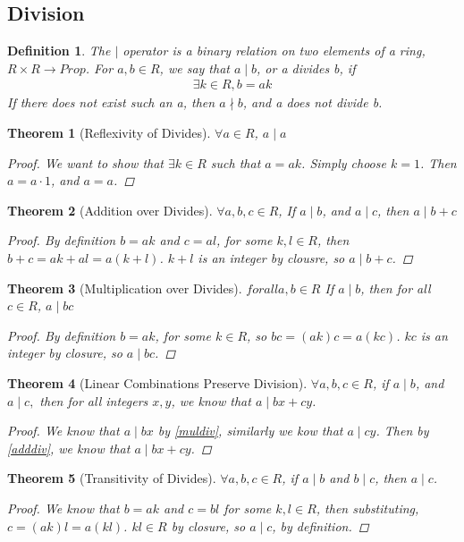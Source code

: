 \documentclass{article}
\newtheorem{thm}{Theorem}
\newtheorem*{defun}{Definition}
\begin{document}
  \subsection{Division}
  \begin{defun} The $\mid$ operator is a binary relation on two elements of a ring, $R \times R \to Prop$. For $a, b \in R$, we say that $a \mid b$, or a divides b, if
    \begin{align*}
      \exists k \in R, b = ak
    \end{align*}
    If there does not exist such an a, then $a \nmid b$, and a does not divide b.
  \end{defun}
  \begin{thm}[Reflexivity of Divides]\label{divrefl} $\forall a \in R$, $a \mid a$
    \begin{proof}
      We want to show that $\exists k \in R$ such that $a = ak$. Simply choose $k = 1$. Then $a = a\cdot1$, and $a = a$.
    \end{proof}
  \end{thm}
  \begin{thm}[Addition over Divides]\label{adddiv} $\forall a, b, c \in R$, If $a \mid b$, and $a \mid c$, then $a \mid b + c$
    \begin{proof}
      By definition $b = ak$ and $c = al$, for some $k, l \in R$, then $b + c = ak + al = a(k + l)$. $k+l$ is an integer by clousre, so $a \mid b+c$.
    \end{proof}
  \end{thm}
  \begin{thm} [Multiplication over Divides]\label{muldiv} $forall a, b \in R$ If $a \mid b$, then for all $c \in R$, $a \mid bc$
    \begin{proof}
      By definition $b = ak$, for some $k \in R$, so $bc = (ak)c = a(kc)$. $kc$ is an integer by closure, so $a \mid bc$. 
    \end{proof}
  \end{thm}
  \begin{thm} [Linear Combinations Preserve Division]\label{lindiv} $\forall a, b, c \in R$, if $a \mid b$, and $a \mid c, $ then for all integers $x, y$, we know that $a \mid bx + cy$. 
    \begin{proof}
      We know that $a \mid bx$ by \eqref{muldiv}, similarly we kow that $a \mid cy$. Then by \eqref{adddiv}, we know that $a \mid bx + cy$.
    \end{proof}
  \end{thm}
  \begin{thm} [Transitivity of Divides]\label{divtrans} $\forall a, b, c \in R$, if $a \mid b$ and $b \mid c$, then $a \mid c$.
    \begin{proof}
      We know that $b = ak$ and $c = bl$ for some $k, l \in R$, then substituting, $c = (ak)l = a(kl)$. $kl \in R$ by closure, so $a \mid c$, by definition. 
    \end{proof}
  \end{thm}
\end{document}
